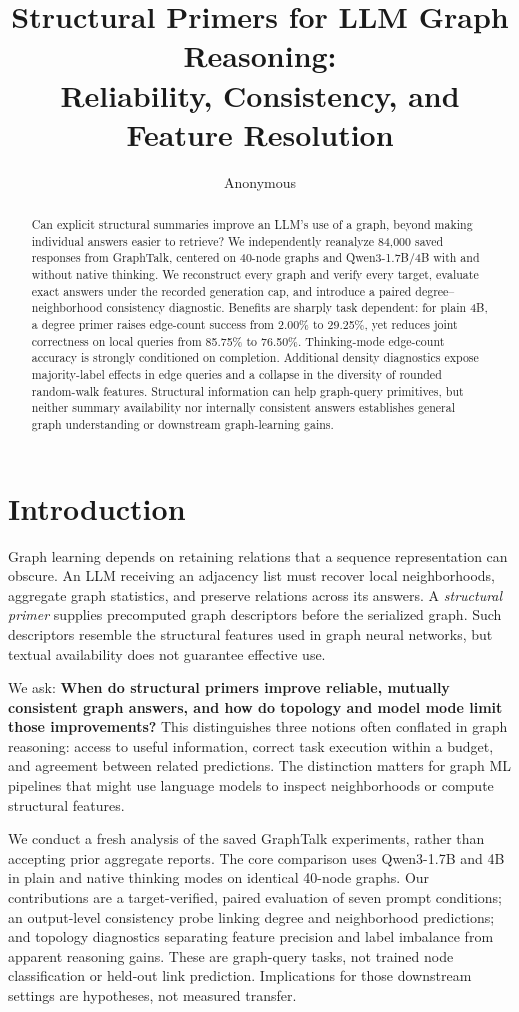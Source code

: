 \documentclass[11pt]{article}
\title{Structural Primers for LLM Graph Reasoning:\\Reliability, Consistency, and Feature Resolution}
\author{Anonymous}
\begin{document}
\maketitle
\begin{abstract}
Can explicit structural summaries improve an LLM's use of a graph, beyond making individual answers easier to retrieve? We independently reanalyze 84,000 saved responses from GraphTalk, centered on 40-node graphs and Qwen3-1.7B/4B with and without native thinking. We reconstruct every graph and verify every target, evaluate exact answers under the recorded generation cap, and introduce a paired degree--neighborhood consistency diagnostic. Benefits are sharply task dependent: for plain 4B, a degree primer raises edge-count success from 2.00\% to 29.25\%, yet reduces joint correctness on local queries from 85.75\% to 76.50\%. Thinking-mode edge-count accuracy is strongly conditioned on completion. Additional density diagnostics expose majority-label effects in edge queries and a collapse in the diversity of rounded random-walk features. Structural information can help graph-query primitives, but neither summary availability nor internally consistent answers establishes general graph understanding or downstream graph-learning gains.
\end{abstract}

\section{Introduction}
Graph learning depends on retaining relations that a sequence representation can obscure. An LLM receiving an adjacency list must recover local neighborhoods, aggregate graph statistics, and preserve relations across its answers. A \emph{structural primer} supplies precomputed graph descriptors before the serialized graph. Such descriptors resemble the structural features used in graph neural networks, but textual availability does not guarantee effective use.

We ask: \textbf{When do structural primers improve reliable, mutually consistent graph answers, and how do topology and model mode limit those improvements?} This distinguishes three notions often conflated in graph reasoning: access to useful information, correct task execution within a budget, and agreement between related predictions. The distinction matters for graph ML pipelines that might use language models to inspect neighborhoods or compute structural features.

We conduct a fresh analysis of the saved GraphTalk experiments, rather than accepting prior aggregate reports. The core comparison uses Qwen3-1.7B and 4B in plain and native thinking modes on identical 40-node graphs. Our contributions are a target-verified, paired evaluation of seven prompt conditions; an output-level consistency probe linking degree and neighborhood predictions; and topology diagnostics separating feature precision and label imbalance from apparent reasoning gains. These are graph-query tasks, not trained node classification or held-out link prediction. Implications for those downstream settings are hypotheses, not measured transfer.
\end{document}
